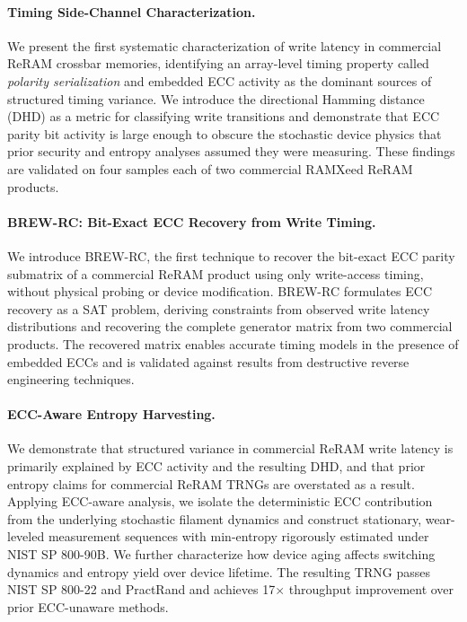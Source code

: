 \paragraph{Timing Side-Channel Characterization.}
We present the first systematic characterization of write latency in
commercial ReRAM crossbar memories, identifying an array-level timing
property called \emph{polarity serialization} and embedded ECC activity
as the dominant sources of structured timing variance. We introduce the
directional Hamming distance (DHD) as a metric for classifying write
transitions and demonstrate that ECC parity bit activity is large enough
to obscure the stochastic device physics that prior security and entropy
analyses assumed they were measuring. These findings are validated on
four samples each of two commercial RAMXeed ReRAM products.

\paragraph{BREW-RC: Bit-Exact ECC Recovery from Write Timing.}
We introduce BREW-RC, the first technique to recover the bit-exact ECC
parity submatrix of a commercial ReRAM product using only write-access
timing, without physical probing or device modification. BREW-RC
formulates ECC recovery as a SAT problem, deriving constraints from
observed write latency distributions and recovering the complete
generator matrix from two commercial products. The recovered matrix
enables accurate timing models in the presence of embedded ECCs and is
validated against results from destructive reverse engineering
techniques.

\paragraph{ECC-Aware Entropy Harvesting.}
We demonstrate that structured variance in commercial ReRAM write
latency is primarily explained by ECC activity and the resulting DHD,
and that prior entropy claims for commercial ReRAM TRNGs are overstated
as a result. Applying ECC-aware analysis, we isolate the deterministic
ECC contribution from the underlying stochastic filament dynamics and
construct stationary, wear-leveled measurement sequences with
min-entropy rigorously estimated under NIST SP 800-90B. We further
characterize how device aging affects switching dynamics and entropy
yield over device lifetime. The resulting TRNG passes NIST SP 800-22 and
PractRand and achieves 17$\times$ throughput improvement over prior
ECC-unaware methods.